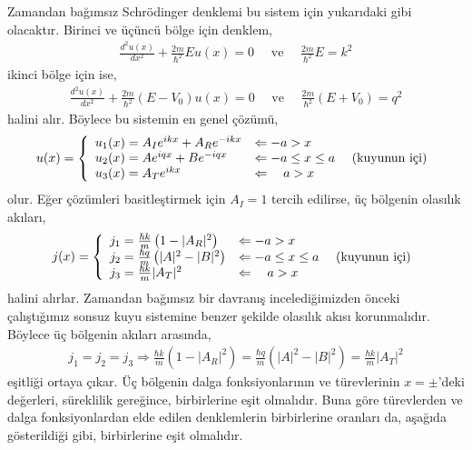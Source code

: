 \documentclass[a4paper,12pt, twoside]{article}
\begin{document}
Zamandan bağımsız Schrödinger denklemi bu sistem için yukarıdaki gibi olacaktır. Birinci ve üçüncü bölge için denklem,
\begin{align}
\frac { d ^ { 2 } u ( x ) } { d x ^ { 2 } } +  \frac { 2 m} { \hbar ^ { 2 } } E u ( x ) = 0 \quad \text{ ve } \quad \frac { 2 m} { \hbar ^ { 2 } } E = k ^ { 2 }
\end{align}
ikinci bölge için ise,
\begin{align}
\frac { d ^ { 2 } u ( x ) } { d x ^ { 2 } } +  \frac { 2 m} { \hbar ^ { 2 } }  \left( E - V _ { 0 } \right) u ( x ) = 0 \quad \text{ ve } \quad \frac { 2 m} { \hbar ^ { 2 } }  \left( E + V _ { 0 } \right) = q ^ { 2 }
\end{align}
halini alır. Böylece bu sistemin en genel çözümü,
\begin{align}
u ( x )  = \left\{ 
\begin{array} { l l } 
{u_1(x) = A_I e^{i k x} + A_R e^{-i k x} } & {\Leftarrow -a > x } \\
{u_2(x) = A e^{i q x} + B e^{-i q x} } & {\Leftarrow -a \leq x \leq a } \quad \text{ (kuyunun içi)} \\
{u_3(x) = A_T e^{i k x}} & {\Leftarrow \quad a > x }
\end{array} \right. 
\end{align}
olur. Eğer çözümleri basitleştirmek için $A_I=1$ tercih edilirse, üç bölgenin olasılık akıları,
\begin{align}
j ( x )  = \left\{ 
\begin{array} { l l } 
{j_1 = \frac{\hbar k}{m}\left(1-|A_R|^{2}\right) } & {\Leftarrow -a > x } \\
{j_2 = \frac{\hbar q}{m}\left(|A|^{2}-|B|^{2}\right) } & {\Leftarrow -a \leq x \leq a } \quad \text{ (kuyunun içi)} \\
{j_3 = \frac{\hbar k}{m}|A_T|^{2}} & {\Leftarrow \quad a > x }
\end{array} \right. 
\end{align}
halini alırlar. Zamandan bağımsız bir davranış incelediğimizden önceki çalıştığımız sonsuz kuyu sistemine benzer şekilde olasılık akısı korunmalıdır. Böylece üç bölgenin akıları arasında,
\begin{align}
	j_1 = 	j_2 = 	j_3 \Longrightarrow \frac{\hbar k}{m}\left(1-|A_R|^{2}\right)=\frac{\hbar q}{m}\left(|A|^{2}-|B|^{2}\right)=\frac{\hbar k}{m}|A_T|^{2}
	\label{eq:sonlukuyu_j1j2j3}
\end{align}
eşitliği ortaya çıkar. Üç bölgenin dalga fonksiyonlarının ve türevlerinin $x=\pm$'deki değerleri, süreklilik gereğince, birbirlerine eşit olmalıdır. Buna göre türevlerden ve dalga fonksiyonlardan elde edilen denklemlerin birbirlerine oranları da, aşağıda gösterildiği gibi, birbirlerine eşit olmalıdır. 
\end{document}
